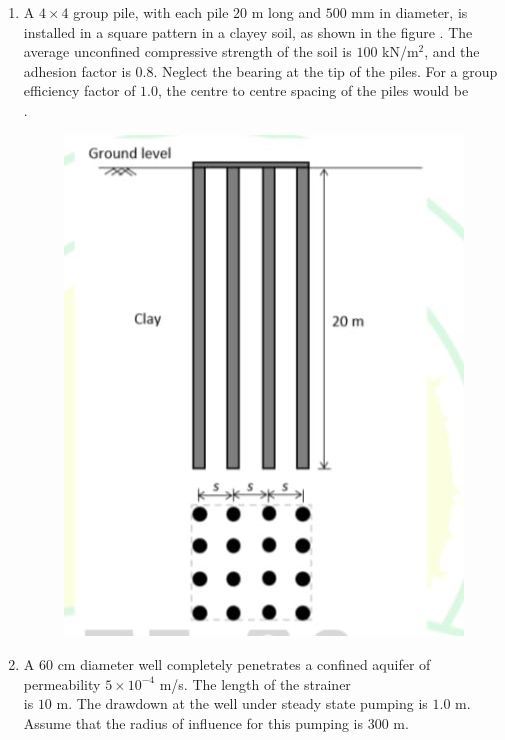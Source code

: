 \documentclass[journal,12pt,onecolumn]{article}
\theoremstyle{remark}
\begin{document}
\begin{enumerate}
    \hfill{}
    
    \item A $4 \times 4$ group pile, with each pile $20$ m long and $500$ mm in diameter, is installed in a square pattern in a clayey soil, as shown in the figure . The average unconfined compressive strength of the soil is $100$ kN/m$^2$, and the adhesion factor is $0.8$. Neglect the bearing at the tip of the piles. For a group efficiency factor of $1.0$, the centre to centre spacing  of the piles  would be \underline{\hspace{2cm}} \\ .
    \begin{figure}[H]
        \centering
        \includegraphics[width=0.7\columnwidth]{figs/2q-57.jpg}
        \caption{}
        \label{fig:q57}
    \end{figure}
    
    \hfill{}
    
    \item A $60$ cm diameter well completely penetrates a confined aquifer of permeability $5 \times 10^{-4}$ m/s. The length of the strainer \\  is $10$ m. The drawdown at the well under steady state pumping is $1.0$ m. Assume that the radius of influence for this pumping is $300$ m.
    

\end{enumerate}
\end{document}
